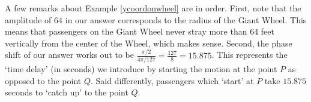 {
}

\medskip

A few remarks about Example \ref{ycoordonwheel} are in order.  First, note that the amplitude of $64$ in our answer corresponds to the radius of the Giant Wheel.  This means that passengers on the Giant Wheel never stray more than $64$ feet vertically from the center of the Wheel, which makes sense.  Second, the phase shift of our answer works out to be $\frac{\pi/2}{4\pi/127} = \frac{127}{8} = 15.875$.  This represents the `time delay' (in seconds) we introduce by starting the motion at the point $P$ as opposed to the point $Q$.  Said differently, passengers which `start' at $P$ take  $15.875$ seconds to `catch up' to the point $Q$.  

\medskip










